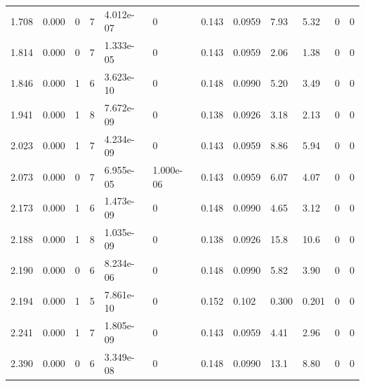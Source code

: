 \documentclass[preview]{standalone}
\begin{document}
{{\begin{tabular}{L{1.2cm}C{1.2cm} C{0.3cm}C{0.5cm} C{1.4cm}C{1.4cm} C{1.4cm}C{1.4cm} C{1.6cm}C{1.6cm} C{1.6cm}C{1.6cm}}
  1.708  &  0.000  & 0     &  7 &  4.012e-07  & 0  &  0.143&   0.0959& 7.93 & 5.32   &  0 & 0  \\ 
  1.814  &  0.000  & 0     &  7 &  1.333e-05  & 0  &  0.143&   0.0959& 2.06 & 1.38   &  0 & 0  \\ 
  1.846  &  0.000  & 1     &  6 &  3.623e-10  & 0  &  0.148&   0.0990& 5.20 & 3.49   &  0 & 0  \\ 
  1.941  &  0.000  & 1     &  8 &  7.672e-09  & 0  &  0.138&   0.0926& 3.18 & 2.13   &  0 & 0  \\ 
  2.023  &  0.000  & 1     &  7 &  4.234e-09  & 0  &  0.143&   0.0959& 8.86 & 5.94   &  0 & 0  \\ 
  2.073  &  0.000  & 0     &  7 &  6.955e-05  & 1.000e-06  &  0.143&   0.0959& 6.07 & 4.07   &  0 & 0  \\ 
  2.173  &  0.000  & 1     &  6 &  1.473e-09  & 0  &  0.148&   0.0990& 4.65 & 3.12   &  0 & 0  \\ 
  2.188  &  0.000  & 1     &  8 &  1.035e-09  & 0  &  0.138&   0.0926& 15.8 & 10.6   &  0 & 0  \\ 
  2.190  &  0.000  & 0     &  6 &  8.234e-06  & 0  &  0.148&   0.0990& 5.82 & 3.90   &  0 & 0  \\ 
  2.194  &  0.000  & 1     &  5 &  7.861e-10  & 0  &  0.152&   0.102& 0.300 & 0.201   &  0 & 0  \\ 
  2.241  &  0.000  & 1     &  7 &  1.805e-09  & 0  &  0.143&   0.0959& 4.41 & 2.96   &  0 & 0  \\ 
  2.390  &  0.000  & 0     &  6 &  3.349e-08  & 0  &  0.148&   0.0990& 13.1 & 8.80   &  0 & 0  \\ 
\hline 
\end{tabular} 

}}
\end{document}
